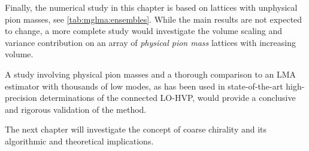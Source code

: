 Finally, the numerical study in this chapter is based on lattices with unphysical pion masses, see \cref{tab:mglma:ensembles}.
While the main results are not expected to change, a more complete study would investigate the volume scaling and variance contribution on an array of \emph{physical pion mass} lattices with increasing volume.

A study involving physical pion masses and a thorough comparison to an LMA estimator with thousands of low modes, as has been used in state-of-the-art high-precision determinations of the connected LO-HVP, would provide a conclusive and rigorous validation of the method.

The next chapter will investigate the concept of coarse chirality and its algorithmic and theoretical implications.



